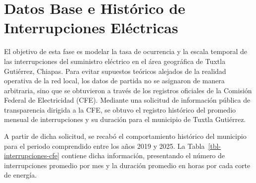 \documentclass[
  spanish,
  us-letterpaper,
]{scrreprt}
\numberwithin{equation}{section}
\theoremstyle{plain}
\theoremstyle{plain}
\theoremstyle{plain}
\theoremstyle{definition}
\theoremstyle{remark}
\begin{document}
\section{Datos Base e Histórico de Interrupciones
Eléctricas}\label{sec-datos-cfe}

El objetivo de esta fase es modelar la tasa de ocurrencia y la escala
temporal de las interrupciones del suministro eléctrico en el área
geográfica de Tuxtla Gutiérrez, Chiapas. Para evitar supuestos teóricos
alejados de la realidad operativa de la red local, los datos de partida
no se asignaron de manera arbitraria, sino que se obtuvieron a través de
los registros oficiales de la Comisión Federal de Electricidad (CFE).
Mediante una solicitud de información pública de transparencia dirigida
a la CFE, se obtuvo el registro histórico del promedio mensual de
interrupciones y su duración para el municipio de Tuxtla Gutiérrez.

A partir de dicha solicitud, se recabó el comportamiento histórico del
municipio para el periodo comprendido entre los años 2019 y 2025. La
Tabla~\ref{tbl-interrupciones-cfe} contiene dicha información,
presentando el número de interrupciones promedio por mes y la duración
promedio en horas por cada corte de energía.
\end{document}
